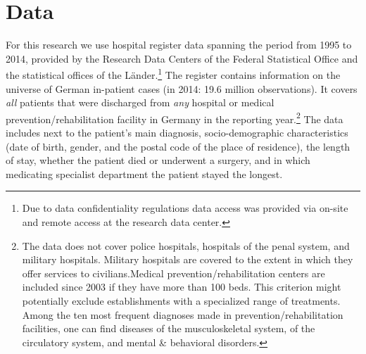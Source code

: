 \documentclass[11pt, a4paper]{article} %
\begin{document}
\section{Data}\label{sec:data}
For this research we use hospital register data spanning the period from 1995 to 2014, provided by the Research Data Centers of the Federal Statistical Office and the statistical offices of the Länder.\footnote{Due to data confidentiality regulations data access was provided via on-site and remote access at the research data center.} The register contains information on the universe of German in-patient cases (in 2014: 19.6 million observations). It covers \textit{all} patients that were discharged from \textit{any} hospital or medical prevention/rehabilitation facility in Germany in the reporting year.\footnote{The data does not cover police hospitals, hospitals of the penal system, and military hospitals. Military hospitals are covered to the extent in which they offer services to civilians.\newline Medical prevention/rehabilitation centers are included since 2003 if they have more than 100 beds. This criterion might potentially exclude establishments with a specialized range of treatments. Among the ten most frequent diagnoses made in prevention/rehabilitation facilities, one can find diseases of the musculoskeletal system, of the circulatory system, and mental \& behavioral disorders.} The data includes next to the patient's main diagnosis, socio-demographic characteristics (date of birth, gender, and the postal code of the place of residence), the length of stay, whether the patient died or underwent a surgery, and in which medicating specialist department the patient stayed the longest.\newline 
\end{document}
